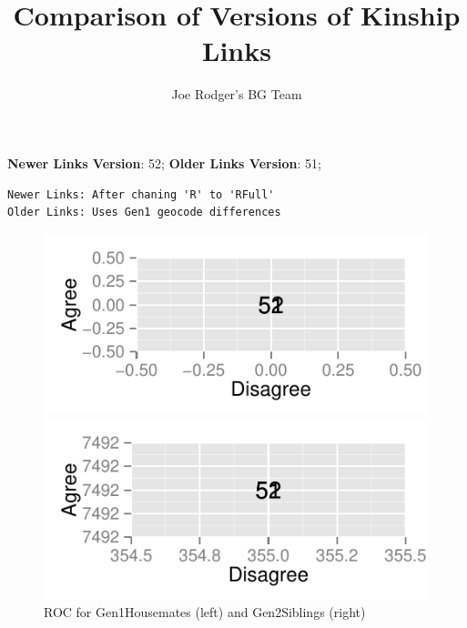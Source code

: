 \documentclass[a4paper]{article}\usepackage{graphicx, color}
\title{Comparison of Versions of Kinship Links}
\author{Joe Rodger's BG Team}
\makeatletter
\def\maxwidth{ %
  \ifdim\Gin@nat@width>\linewidth
    \linewidth
  \else
    \Gin@nat@width
  \fi
}
\newenvironment{kframe}{%
 \def\at@end@of@kframe{}%
 \ifinner\ifhmode%
  \def\at@end@of@kframe{\end{minipage}}%
  \begin{minipage}{\columnwidth}%
 \fi\fi%
 \def\FrameCommand##1{\hskip\@totalleftmargin \hskip-\fboxsep
 \colorbox{shadecolor}{##1}\hskip-\fboxsep
     \hskip-\linewidth \hskip-\@totalleftmargin \hskip\columnwidth}%
 \MakeFramed {\advance\hsize-\width
   \@totalleftmargin\z@ \linewidth\hsize
   \@setminipage}}%
 {\par\unskip\endMakeFramed%
 \at@end@of@kframe}
\newenvironment{knitrout}{}{} %
\makeatother
\begin{document}
\maketitle

\setlength{\parindent}{0pt}%







\textbf{Newer Links Version}: 52;
\textbf{Older Links Version}: 51;

\begin{knitrout}
\color{fgcolor}\begin{kframe}
\begin{verbatim}
Newer Links: After chaning 'R' to 'RFull'
Older Links: Uses Gen1 geocode differences
\end{verbatim}
\end{kframe}
\end{knitrout}


\begin{figure}[htbp]
\begin{knitrout}
\color{fgcolor}
\includegraphics[width=\maxwidth]{figure/unnamed-chunk-31} 

\includegraphics[width=\maxwidth]{figure/unnamed-chunk-32} 

\end{knitrout}

\caption{ROC for Gen1Housemates (left) and Gen2Siblings (right)}
\end{figure}
\end{document}
